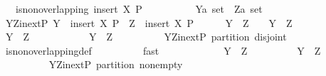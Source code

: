 \begin{isabellebody}
\ \ \ {\isachardoublequoteopen}is{\isacharunderscore}non{\isacharunderscore}overlapping\ {\isacharparenleft}insert\ X\ P{\isacharparenright}{\isachardoublequoteclose}\isanewline
%
\isadelimproof
%
\endisadelimproof
%
\isatagproof
{}\isamarkupfalse%
\ {\isacharminus}\isanewline
\ \ \isacommand{{\isacharbraceleft}}\isamarkupfalse%
\isanewline
\ \ \ \ \isamarkupfalse%
\ Y{\isacharcolon}{\isacharcolon}{\isachardoublequoteopen}{\isacharprime}a\ set{\isachardoublequoteclose}\ \ Z{\isacharcolon}{\isacharcolon}{\isachardoublequoteopen}{\isacharprime}a\ set{\isachardoublequoteclose}\isanewline
\ \ \ \ \isamarkupfalse%
\ Y{\isacharunderscore}Z{\isacharunderscore}in{\isacharunderscore}ext{\isacharunderscore}P{\isacharcolon}\ {\isachardoublequoteopen}Y\ {\isasymin}\ insert\ X\ P\ {\isasymand}\ Z\ {\isasymin}\ insert\ X\ P{\isachardoublequoteclose}\isanewline
\ \ \ \ \isamarkupfalse%
\ {\isachardoublequoteopen}Y\ {\isasyminter}\ Z\ {\isasymnoteq}\ {\isacharbraceleft}{\isacharbraceright}\ {\isasymlongleftrightarrow}\ Y\ {\isacharequal}\ Z{\isachardoublequoteclose}\isanewline
\ \ \ \ \isamarkupfalse%
\isanewline
\ \ \ \ \ \ \isamarkupfalse%
\ {\isachardoublequoteopen}Y\ {\isasyminter}\ Z\ {\isasymnoteq}\ {\isacharbraceleft}{\isacharbraceright}{\isachardoublequoteclose}\isanewline
\ \ \ \ \ \ \isamarkupfalse%
\ \isamarkupfalse%
\ {\isachardoublequoteopen}Y\ {\isacharequal}\ Z{\isachardoublequoteclose}\isanewline
\ \ \ \ \ \ \ \ \isamarkupfalse%
\ Y{\isacharunderscore}Z{\isacharunderscore}in{\isacharunderscore}ext{\isacharunderscore}P\ partition\ disjoint\isanewline
\ \ \ \ \ \ \ \ \isamarkupfalse%
\ is{\isacharunderscore}non{\isacharunderscore}overlapping{\isacharunderscore}def\isanewline
\ \ \ \ \ \ \ \ \isamarkupfalse%
\ fast\isanewline
\ \ \ \ \isamarkupfalse%
\isanewline
\ \ \ \ \ \ \isamarkupfalse%
\ {\isachardoublequoteopen}Y\ {\isacharequal}\ Z{\isachardoublequoteclose}\isanewline
\ \ \ \ \ \ \isamarkupfalse%
\ \isamarkupfalse%
\ {\isachardoublequoteopen}Y\ {\isasyminter}\ Z\ {\isasymnoteq}\ {\isacharbraceleft}{\isacharbraceright}{\isachardoublequoteclose}\isanewline
\ \ \ \ \ \ \ \ \isamarkupfalse%
\ Y{\isacharunderscore}Z{\isacharunderscore}in{\isacharunderscore}ext{\isacharunderscore}P\ partition\ non{\isacharunderscore}empty\isanewline
\ \ \ \ \ \ \ \ \isamarkupfalse%

\end{isabellebody}
